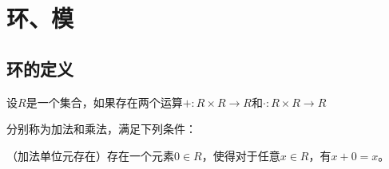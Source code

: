 \documentclass[12pt, a4paper, oneside, UTF8]{ctexbook}
\begin{document}
% 
\else
\fi
\chapter{环、模}
	\section{环的定义}
		\begin{defn}{}
			设$R$是一个集合，如果存在两个运算$+ : R \times R \rightarrow R$和$\cdot : R \times R \rightarrow R$

			分别称为加法和乘法，满足下列条件：

			 （加法单位元存在）存在一个元素$0 \in R$，使得对于任意$x \in R$，有$x + 0 = x$。
		\end{defn}
\ifx\allfiles\undefined
\end{document}
